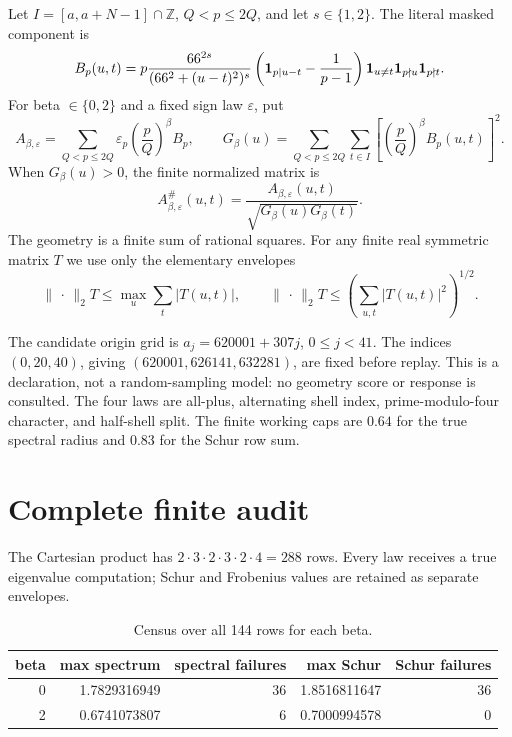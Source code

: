 \documentclass[10pt]{article}
\newcommand{\opnorm}{\lVert\,\cdot\,\rVert_2}
\begin{document}
Let $I=[a,a+N-1]\cap\mathbb Z$, $Q<p\leq2Q$, and let $s\in\{1,2\}$.  The
literal masked component is
\begin{equation}
B_p(u,t)=p\frac{66^{2s}}{(66^2+(u-t)^2)^s}
 \left({\bf1}_{p\mid u-t}-\frac1{p-1}\right)
 {\bf1}_{u\ne t}{\bf1}_{p\nmid u}{\bf1}_{p\nmid t}.
\label{eq:block}
\end{equation}
For beta $\in\{0,2\}$ and a fixed sign law $\varepsilon$, put
\begin{equation}
A_{\beta,\varepsilon}=\sum_{Q<p\leq2Q}\varepsilon_p
 \left(\frac pQ\right)^\beta B_p,\qquad
G_\beta(u)=\sum_{Q<p\leq2Q}\sum_{t\in I}
 \left[\left(\frac pQ\right)^\beta B_p(u,t)\right]^2.
\label{eq:weighted}
\end{equation}
When $G_\beta(u)>0$, the finite normalized matrix is
\begin{equation}
A_{\beta,\varepsilon}^{\#}(u,t)=
\frac{A_{\beta,\varepsilon}(u,t)}
 {\sqrt{G_\beta(u)G_\beta(t)}}.
\label{eq:norm}
\end{equation}
The geometry is a finite sum of rational squares.  For any finite real
symmetric matrix $T$ we use only the elementary envelopes
\begin{equation}
\opnorm{T}\leq\max_u\sum_t|T(u,t)|,
\qquad
\opnorm{T}\leq\left(\sum_{u,t}|T(u,t)|^2\right)^{1/2}.
\label{eq:envelopes}
\end{equation}

The candidate origin grid is $a_j=620001+307j$, $0\leq j<41$.  The indices
$(0,20,40)$, giving $(620001,626141,632281)$, are fixed before replay.  This
is a declaration, not a random-sampling model: no geometry score or response
is consulted.  The four laws are all-plus, alternating shell index,
prime-modulo-four character, and half-shell split.  The finite working caps
are $0.64$ for the true spectral radius and $0.83$ for the Schur row sum.

\section{Complete finite audit}

The Cartesian product has
$2\cdot3\cdot2\cdot3\cdot2\cdot4=288$ rows.  Every law receives a true
eigenvalue computation; Schur and Frobenius values are retained as separate
envelopes.

\begin{table}[t]
\centering
\caption{Census over all 144 rows for each beta.}
\label{tab:beta}
\small
\begin{tabular}{r r r r r}
\toprule
beta & max spectrum & spectral failures & max Schur & Schur failures\\
\midrule
0 & 1.7829316949 & 36 & 1.8516811647 & 36\\
2 & 0.6741073807 & 6 & 0.7000994578 & 0\\
\bottomrule
\end{tabular}
\end{table}
\end{document}
